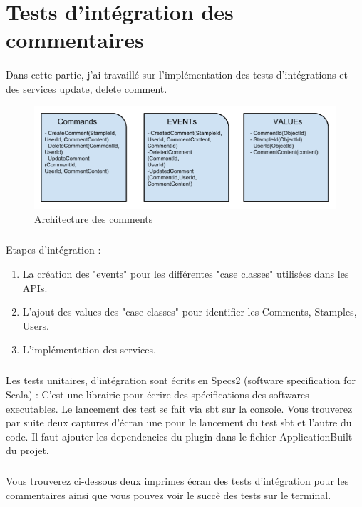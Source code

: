 \section{Tests d'intégration des commentaires}
\paragraph{}
Dans cette partie, j'ai travaillé sur l'implémentation des tests d'intégrations et des services update, delete comment.
\begin{figure}[H]
        \centering
                \centering
                \includegraphics[width=\textwidth]{Comment.png}
               \caption{Architecture des comments}
		\label{fig:Design des commentaires}
\end{figure}
\subparagraph{}
Etapes d'intégration :
\begin{enumerate}
\item La création des "events" pour les différentes "case classes" utilisées dans les APIs.
\item L'ajout des values des "case classes" pour identifier les Comments, Stamples, Users. 
\item L'implémentation des services.
\end{enumerate}
\subparagraph{}
Les tests unitaires, d'intégration sont écrits en Specs2 (software specification for Scala) : C'est une librairie pour écrire des spécifications des softwares executables. Le lancement des test se fait via sbt sur la console.
Vous trouverez par suite deux captures d'écran une pour le lancement du test sbt et l'autre du code.
Il faut ajouter les dependencies du plugin dans le fichier ApplicationBuilt du projet.
\newpage
\subparagraph{}
Vous trouverez ci-dessous deux imprimes écran des tests d'intégration pour les commentaires ainsi que vous pouvez voir le succè des tests sur le terminal.
